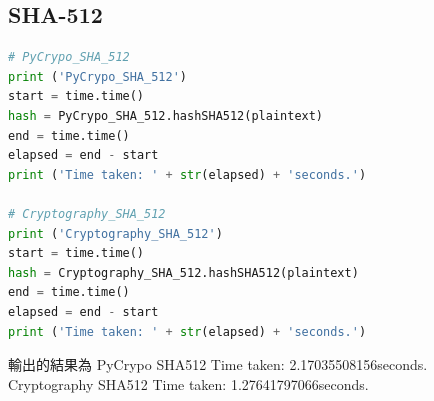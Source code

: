 \documentclass[12pt,a4paper]{article}
\begin{document}
\subsection{SHA-512}
{
\begin{lstlisting}[language=Python]
# PyCrypo_SHA_512
print ('PyCrypo_SHA_512')
start = time.time()
hash = PyCrypo_SHA_512.hashSHA512(plaintext)
end = time.time()
elapsed = end - start
print ('Time taken: ' + str(elapsed) + 'seconds.')

# Cryptography_SHA_512
print ('Cryptography_SHA_512')
start = time.time()
hash = Cryptography_SHA_512.hashSHA512(plaintext)
end = time.time()
elapsed = end - start
print ('Time taken: ' + str(elapsed) + 'seconds.')	
\end{lstlisting}
輸出的結果為
\newline PyCrypo SHA512
Time taken: 2.17035508156seconds.
\newline Cryptography SHA512
Time taken: 1.27641797066seconds.
}
\end{document}
